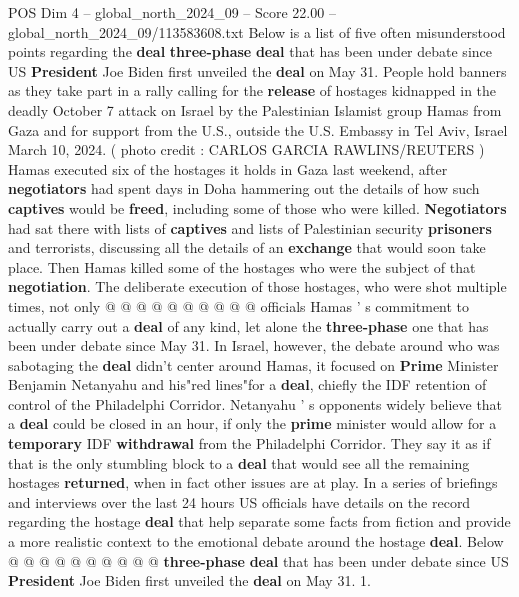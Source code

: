 \begin{textsample}{POS Dim 4 – global\_north\_2024\_09 – Score 22.00 – global\_north\_2024\_09/113583608.txt}  \label{ex:f4_pos_312}
Below is a list of five often misunderstood points regarding the \textbf{deal} \textbf{three-phase} \textbf{deal} that has been under debate since US \textbf{President} Joe Biden first unveiled the \textbf{deal} on May 31.
People hold banners as they take part in a rally calling for the \textbf{release} of hostages kidnapped in the deadly October 7 attack on Israel by the Palestinian Islamist group Hamas from Gaza and for support from the U.S., outside the U.S.
Embassy in Tel Aviv, Israel March 10, 2024. ( photo credit : CARLOS GARCIA RAWLINS/REUTERS ) Hamas executed six of the hostages it holds in Gaza last weekend, after \textbf{negotiators} had spent days in Doha hammering out the details of how such \textbf{captives} would be \textbf{freed}, including some of those who were killed. \textbf{Negotiators} had sat there with lists of \textbf{captives} and lists of Palestinian security \textbf{prisoners} and terrorists, discussing all the details of an \textbf{exchange} that would soon take place.
Then Hamas killed some of the hostages who were the subject of that \textbf{negotiation}.
The deliberate execution of those hostages, who were shot multiple times, not only @ @ @ @ @ @ @ @ @ @ officials Hamas ' s commitment to actually carry out a \textbf{deal} of any kind, let alone the \textbf{three-phase} one that has been under debate since May 31.
In Israel, however, the debate around who was sabotaging the \textbf{deal} didn't center around Hamas, it focused on \textbf{Prime} Minister Benjamin Netanyahu and his"red lines"for a \textbf{deal}, chiefly the IDF retention of control of the Philadelphi Corridor.
Netanyahu ' s opponents widely believe that a \textbf{deal} could be closed in an hour, if only the \textbf{prime} minister would allow for a \textbf{temporary} IDF \textbf{withdrawal} from the Philadelphi Corridor.
They say it as if that is the only stumbling block to a \textbf{deal} that would see all the remaining hostages \textbf{returned}, when in fact other issues are at play.
In a series of briefings and interviews over the last 24 hours US officials have details on the record regarding the hostage \textbf{deal} that help separate some facts from fiction and provide a more realistic context to the emotional debate around the hostage \textbf{deal}.
Below @ @ @ @ @ @ @ @ @ @ \textbf{three-phase} \textbf{deal} that has been under debate since US \textbf{President} Joe Biden first unveiled the \textbf{deal} on May 31. 1.

\end{textsample}

